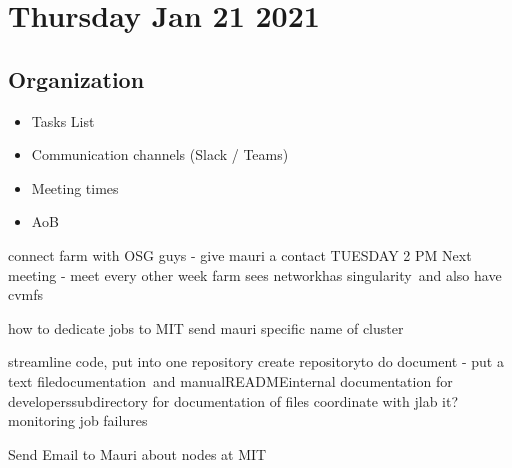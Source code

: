 \section{Thursday Jan 21 2021}
    \subsection*{Organization}
    \begin{itemize}
        \item Tasks List
        \item Communication channels (Slack / Teams)
        \item Meeting times
        \item AoB
    \end{itemize}
    
    
connect farm with OSG guys - give mauri a contact
TUESDAY 2 PM Next meeting - meet every other week
farm sees networkhas singularity and also have cvmfs

how to dedicate jobs to MIT
send mauri specific name of cluster

streamline code, put into one repository
create repositoryto do document - put a text filedocumentation and manualREADMEinternal documentation for developerssubdirectory for documentation of files
coordinate with jlab it?monitoring job failures

Send Email to Mauri about nodes at MIT
